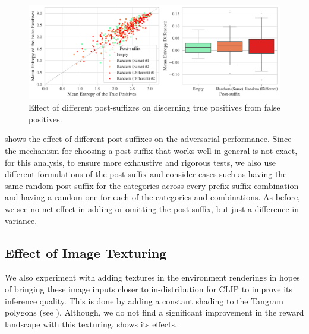 \begin{figure}[H]
    \centering
    \includegraphics[width=\textwidth]{images/post-suffix_adversarial_2.pdf}
    \caption{Effect of different post-suffixes on discerning true positives from false positives.}
    \label{fig:post-suffix-adversarial}
\end{figure}

 shows the effect of different post-suffixes on the adversarial performance.
Since the mechanism for choosing a post-suffix that works well in general is not exact, for this analysis, to ensure more exhaustive and rigorous tests, we also use different formulations of the post-suffix and consider cases such as having the same random post-suffix for the categories across every prefix-suffix combination and having a random one for each of the categories and combinations.
As before, we see no net effect in adding or omitting the post-suffix, but just a difference in variance.


\subsection{Effect of Image Texturing}
\label{sec:image-texturing}
We also experiment with adding textures in the environment renderings
in hopes of bringing these image inputs closer to in-distribution for CLIP to improve its inference quality.
This is done by adding a constant shading to the Tangram polygons (see ).
Although, we do not find a significant improvement in the reward landscape with this texturing.
 shows its effects.


